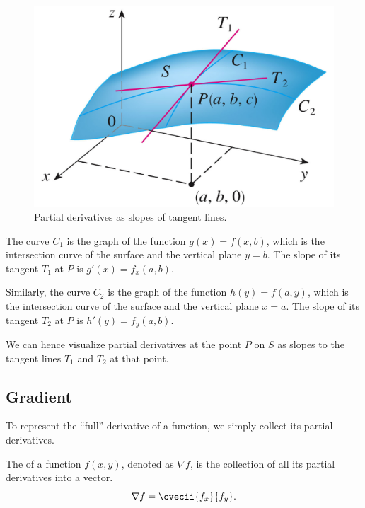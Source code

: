 \begin{figure}[H]
    \centering
    \includegraphics[scale=0.5]{media/partial derivative.png}
    \caption{Partial derivatives as slopes of tangent lines.\protect\footnotemark}
\end{figure}

The curve $C_1$ is the graph of the function $g(x) = f(x, b)$, which is the intersection curve of the surface and the vertical plane $y = b$. The slope of its tangent $T_1$ at $P$ is $g'(x) = f_x(a, b)$.

Similarly, the curve $C_2$ is the graph of the function $h(y) = f(a, y)$, which is the intersection curve of the surface and the vertical plane $x = a$. The slope of its tangent $T_2$ at $P$ is $h'(y) = f_y(a, b)$.

We can hence visualize partial derivatives at the point $P$ on $S$ as slopes to the tangent lines $T_1$ and $T_2$ at that point.

\subsection{Gradient}

To represent the ``full'' derivative of a function, we simply collect its partial derivatives.

\begin{definition}
    The  of a function $f(x, y)$, denoted as $\nabla f$, is the collection of all its partial derivatives into a vector. \[\nabla f = \cvecii{f_x}{f_y}.\]
\end{definition}

